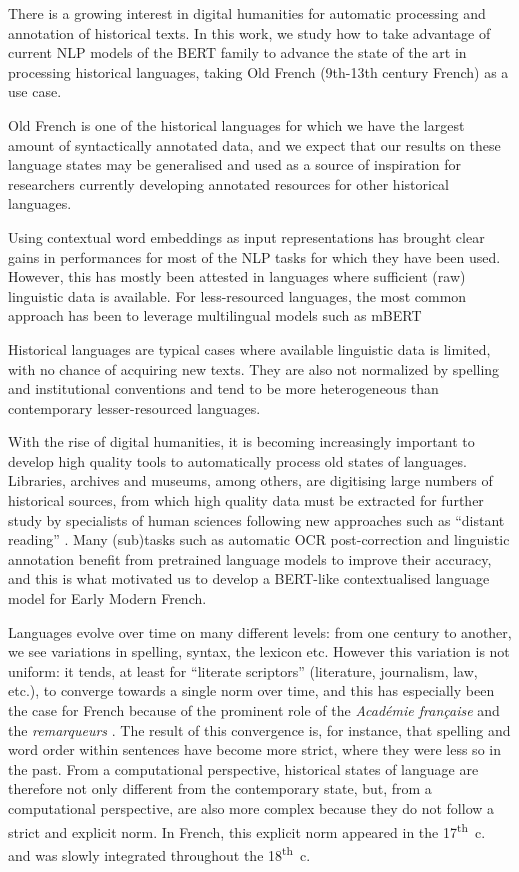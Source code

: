 There is a growing interest in digital humanities for automatic processing and annotation of historical texts. In this work, we study how to take advantage of current NLP models of the BERT family to advance the state of the art in processing historical languages, taking Old French (9th-13th century French) as a use case.

Old French is one of the historical languages for which we have the largest amount of syntactically annotated data, and we expect that our results on these language states may be generalised and used as a source of inspiration for researchers currently developing annotated resources for other historical languages.

Using contextual word embeddings as input representations has brought clear gains in performances for most of the NLP tasks for which they have been used.
However, this has mostly been attested in languages where sufficient (raw) linguistic data is available.
For less-resourced languages, the most common approach has been to leverage multilingual models such as mBERT \citep{devlin-etal-2019-bert}

Historical languages are typical cases where available linguistic data is limited, with no chance of acquiring new texts. They are also not normalized by spelling and institutional conventions and tend to be more heterogeneous than contemporary lesser-resourced languages.

With the rise of digital humanities, it is becoming increasingly important to develop high quality tools to automatically process old states of languages. Libraries, archives and museums, among others, are digitising large numbers of historical sources, from which high quality data must be extracted for further study by specialists of human sciences following new approaches such as ``distant reading'' \cite{moretti-2013-distant}. Many (sub)tasks such as automatic OCR post-correction \cite{rijhwani-etal-2021-lexically} and linguistic annotation \cite{camps-etal-2021-corpus} benefit from pretrained language models to improve their accuracy, and this is what motivated us to develop a BERT-like \cite{devlin-etal-2019-bert} contextualised language model for Early Modern French.

Languages evolve over time on many different levels: from one century to another, we see variations in spelling, syntax, the lexicon etc. However this variation is not uniform: it tends, at least for ``literate scriptors'' (literature, journalism, law, etc.), to converge towards a single norm over time, and this has especially been the case for French because of the prominent role of the \emph{Académie française} and the \emph{remarqueurs} \cite{ayres-bennett-etal-2011-remarques}. The result of this convergence is, for instance, that spelling and word order within sentences have become more strict, where they were less so in the past. From a computational perspective, historical states of language are therefore not only different from the contemporary state, but, from a computational perspective, are also more complex because they do not follow a strict and explicit norm. In French, this explicit norm  appeared in the 17\textsuperscript{th}~c. and was slowly integrated throughout the 18\textsuperscript{th}~c.

